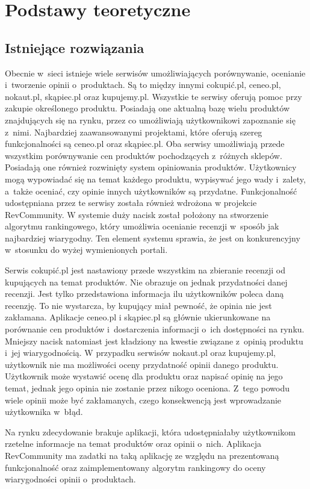 \chapter{Podstawy teoretyczne}

\section{Istniejące rozwiązania}
\label{sec:rozwiazania}
Obecnie w~sieci istnieje wiele serwisów umożliwiających porównywanie, ocenianie i~tworzenie opinii o~produktach. Są to między innymi cokupić.pl,  ceneo.pl, nokaut.pl, skąpiec.pl oraz kupujemy.pl. Wszystkie te serwisy oferują pomoc przy zakupie określonego produktu. Posiadają one aktualną bazę wielu produktów znajdujących się na rynku, przez co umożliwiają użytkownikowi zapoznanie się z~nimi. Najbardziej zaawansowanymi projektami, które oferują szereg funkcjonalności są ceneo.pl oraz skąpiec.pl. Oba serwisy umożliwiają przede wszystkim porównywanie cen produktów pochodzących z~różnych sklepów. Posiadają one  również rozwinięty system opiniowania produktów. Użytkownicy mogą wypowiadać się na temat każdego produktu, wypisywać jego wady i~zalety, a~także oceniać, czy opinie innych użytkowników są przydatne. Funkcjonalność udostępniana przez te serwisy została również wdrożona w projekcie RevCommunity. W systemie duży nacisk został położony na stworzenie algorytmu rankingowego, który umożliwia ocenianie recenzji w~sposób jak najbardziej wiarygodny. Ten element systemu sprawia, że jest on konkurencyjny w~stosunku do wyżej wymienionych portali. 

Serwis cokupić.pl jest nastawiony przede wszystkim na zbieranie recenzji od kupujących na temat produktów. Nie obrazuje on jednak przydatności danej recenzji. Jest tylko przedstawiona informacja ilu użytkowników poleca daną recenzję. To nie wystarcza, by kupujący miał pewność, że opinia nie jest zakłamana. Aplikacje ceneo.pl i skąpiec.pl są głównie ukierunkowane na porównanie cen produktów i~dostarczenia informacji o~ich dostępności na rynku. Mniejszy nacisk natomiast jest kładziony na kwestie związane z~opinią produktu i~jej wiarygodnością.  W przypadku serwisów nokaut.pl oraz kupujemy.pl, użytkownik nie ma możliwości oceny przydatność opinii danego produktu. Użytkownik może wystawić ocenę dla produktu oraz napisać opinię na jego temat, jednak jego opinia nie zostanie przez nikogo oceniona. Z~tego powodu wiele opinii może być zakłamanych, czego konsekwencją jest wprowadzanie użytkownika w~błąd. 

Na rynku zdecydowanie brakuje aplikacji, która udostępniałaby użytkownikom rzetelne informacje na temat produktów oraz opinii o~nich. Aplikacja RevCommunity ma zadatki na taką aplikację ze względu na prezentowaną funkcjonalność oraz zaimplementowany algorytm rankingowy do oceny wiarygodności opinii o~produktach. 



